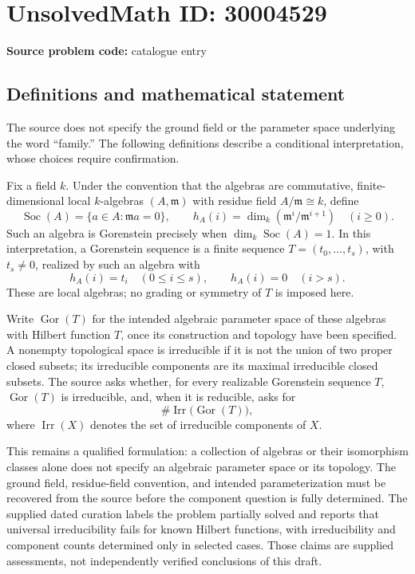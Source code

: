 \documentclass[11pt]{article}
\begin{document}
\section*{UnsolvedMath ID: 30004529}
\textbf{Source problem code:} catalogue entry
\subsection{Definitions and mathematical statement}
The source does not specify the ground field or the parameter space underlying the word ``family.'' The following definitions describe a conditional interpretation, whose choices require confirmation.

Fix a field \(k\). Under the convention that the algebras are commutative, finite-dimensional local \(k\)-algebras \((A,\mathfrak m)\) with residue field \(A/\mathfrak m\cong k\), define
\[
\operatorname{Soc}(A)=\{a\in A:\mathfrak m a=0\},\qquad
h_A(i)=\dim_k(\mathfrak m^i/\mathfrak m^{i+1})\quad(i\geq0).
\]
Such an algebra is Gorenstein precisely when \(\dim_k\operatorname{Soc}(A)=1\). In this interpretation, a Gorenstein sequence is a finite sequence \(T=(t_0,\ldots,t_s)\), with \(t_s\ne0\), realized by such an algebra with
\[
h_A(i)=t_i\quad(0\leq i\leq s),\qquad h_A(i)=0\quad(i>s).
\]
These are local algebras; no grading or symmetry of \(T\) is imposed here.

Write \(\operatorname{Gor}(T)\) for the intended algebraic parameter space of these algebras with Hilbert function \(T\), once its construction and topology have been specified. A nonempty topological space is irreducible if it is not the union of two proper closed subsets; its irreducible components are its maximal irreducible closed subsets. The source asks whether, for every realizable Gorenstein sequence \(T\), \(\operatorname{Gor}(T)\) is irreducible, and, when it is reducible, asks for
\[
\#\operatorname{Irr}\bigl(\operatorname{Gor}(T)\bigr),
\]
where \(\operatorname{Irr}(X)\) denotes the set of irreducible components of \(X\).

This remains a qualified formulation: a collection of algebras or their isomorphism classes alone does not specify an algebraic parameter space or its topology. The ground field, residue-field convention, and intended parameterization must be recovered from the source before the component question is fully determined. The supplied dated curation labels the problem partially solved and reports that universal irreducibility fails for known Hilbert functions, with irreducibility and component counts determined only in selected cases. Those claims are supplied assessments, not independently verified conclusions of this draft.
\end{document}

